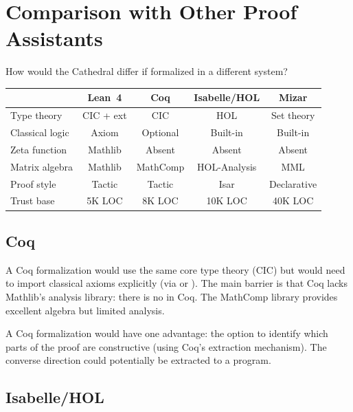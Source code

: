 \documentclass[11pt,a4paper]{article}
\begin{document}
\section{Comparison with Other Proof Assistants}
\label{sec:comparison}

How would the Cathedral differ if formalized in a different system?

\begin{center}
\small
\begin{tabular}{@{}lcccc@{}}
\toprule
& \textbf{Lean~4} & \textbf{Coq} & \textbf{Isabelle/HOL} & \textbf{Mizar} \\
\midrule
Type theory & CIC + ext & CIC & HOL & Set theory \\
Classical logic & Axiom & Optional & Built-in & Built-in \\
Zeta function & Mathlib & Absent & Absent & Absent \\
Matrix algebra & Mathlib & MathComp & HOL-Analysis & MML \\
Proof style & Tactic & Tactic & Isar & Declarative \\
Trust base & 5K LOC & 8K LOC & 10K LOC & 40K LOC \\
\bottomrule
\end{tabular}
\end{center}

\subsection{Coq}

A Coq formalization would use the same core type theory (CIC) but
would need to import classical axioms explicitly (via
 or ). The
main barrier is that Coq lacks Mathlib's analysis library: there is
no  in Coq. The MathComp library provides excellent
algebra but limited analysis.

A Coq formalization would have one advantage: the option to identify
which parts of the proof are constructive (using Coq's extraction
mechanism). The converse direction could potentially be extracted
to a program.

\subsection{Isabelle/HOL}
\end{document}
